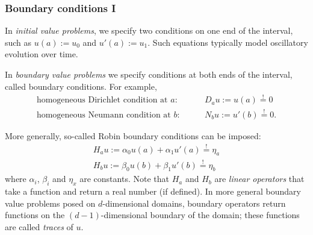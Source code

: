 \documentclass[12pt,a4paper]{article}
\begin{document}
    
    \subsubsection*{Boundary conditions I}
    
    
    In \emph{initial value problems},
    we specify two conditions
    on one end of the interval, 
    such as
    $
        u(a) := u_0
    $
    and
    $
        u'(a) := u_1
    $.
    Such equations typically model oscillatory evolution over time.
    
    
    In \emph{boundary value problems}
    we specify conditions at both ends of the interval,
    called boundary conditions.
    For example,
    \begin{align}
        \text{homogeneous Dirichlet condition at $a$}:
        & 
        \qquad
        D_a u := u(a) \stackrel{!}{=} 0
        \\
        \text{homogeneous Neumann condition at $b$}:
        &
        \qquad
        N_b u := u'(b) \stackrel{!}{=} 0
        .
    \end{align}
    
    
    More generally,
    so-called
    Robin boundary conditions can be imposed:
    \begin{subequations}
        \label{e:H}
        \begin{align}
            H_a u := \alpha_0 u(a) + \alpha_1 u'(a) \stackrel{!}{=} \eta_a
            \\
            H_b u := \beta_0 u(b) + \beta_1 u'(b) \stackrel{!}{=} \eta_b
        \end{align}
    \end{subequations}
    where 
    $\alpha_i$, $\beta_i$ and $\eta_x$ are constants.
    Note that $H_a$ and $H_b$ are
    \emph{linear operators}
    that take a function 
    and return a real number (if defined).
    In more general boundary value problems
    posed on $d$-dimensional domains,
    boundary operators
    return functions on the $(d - 1)$-dimensional boundary 
    of the domain;
    these functions are called \emph{traces} of $u$.
    
\end{document}
